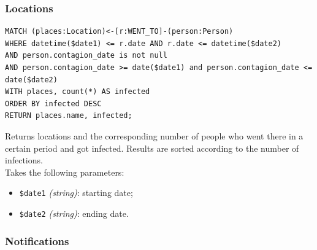 \documentclass[12pt, a4paper]{article}
\begin{document}
\subsubsection{Locations}
\begin{tcolorbox}[fontupper=\scriptsize]
    \begin{verbatim}
MATCH (places:Location)<-[r:WENT_TO]-(person:Person)
WHERE datetime($date1) <= r.date AND r.date <= datetime($date2) 
AND person.contagion_date is not null
AND person.contagion_date >= date($date1) and person.contagion_date <= date($date2)
WITH places, count(*) AS infected
ORDER BY infected DESC
RETURN places.name, infected;
    \end{verbatim}
\end{tcolorbox}
\noindent %
Returns locations and the corresponding number of people who went there in a certain period and got infected. Results are sorted according to the number of infections. \\
Takes the following parameters: 
\begin{itemize}
    \item \texttt{\$date1} \emph{(string)}: starting date;
    \item \texttt{\$date2} \emph{(string)}: ending date.
\end{itemize}

\subsubsection{Notifications}
\end{document}
